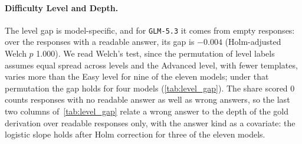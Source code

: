 \paragraph{Difficulty Level and Depth.} The level gap is model-specific, and for \texttt{GLM-5.3} it
comes from empty responses: over the responses with a readable answer, its gap is $-0.004$
(Holm-adjusted Welch $p$ 1.000).
We read Welch's test, since the permutation of level labels assumes equal spread across levels and
the Advanced level, with fewer templates, varies more than the Easy level for nine of the eleven
models; under that permutation the gap holds for four models (\autoref{tab:level_gap}).
The share scored 0 counts responses with no readable answer as well as wrong answers, so the last
two columns of~\autoref{tab:level_gap} relate a wrong answer to the depth of the gold derivation
over readable responses only, with the answer kind as a covariate: the logistic slope holds after
Holm correction for three of the eleven models.

